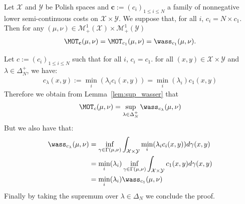 \begin{prop}
Let $\mathcal{X}$ and $\mathcal{Y}$ be Polish spaces and $\mathbf{c}:=(c_i)_{1\leq i\leq N}$ a family of nonnegative lower semi-continuous costs on $\mathcal{X}\times \mathcal{Y}$. We suppose that, for all $i$, $c_i= N\times c_1$. Then for any $(\mu,\nu)\in\mathcal{M}_+^{1}(\mathcal{X})\times\mathcal{M}_+^{1}(\mathcal{Y})$  
\begin{align}
    \MOT_{\mathbf{c}}(\mu,\nu)=\MOT_{c_1}(\mu,\nu)=\wass_{c_1}(\mu,\nu).
\end{align}
\end{prop}
\begin{prv*}
Let $c:=(c_i)_{1\leq i\leq N}$ such that for all $i$, $c_i=c_1$. for all $(x,y)\in\mathcal{X}\times \mathcal{Y}$ and $\lambda\in\Delta^+_N$, we have:
\begin{align*}
    c_\lambda(x,y):=\min_i(\lambda_i c_i(x,y)) = \min_i(\lambda_i)c_1(x,y)
\end{align*}
Therefore we obtain from Lemma~\ref{lem:sup_wasser} that
\begin{align}
    \MOT_{c}(\mu,\nu)=\sup_{\lambda\in\Delta^+_N} \wass_{c_\lambda}(\mu,\nu)
\end{align}
But we also have that:
\begin{align*}
    \wass_{c_\lambda}(\mu,\nu)&=\inf_{\gamma\in\Gamma(\mu,\nu)}\int_{\mathcal{X}\times \mathcal{Y}} \min_i(\lambda_i c_i(x,y))d\gamma(x,y)\\
    &=\min_i(\lambda_i )\inf_{\gamma\in\Gamma(\mu,\nu)}\int_{\mathcal{X}\times \mathcal{Y}} c_1(x,y) d\gamma(x,y)\\
    &=\min_i(\lambda_i )  \wass_{c_1}(\mu,\nu)
\end{align*}
Finally by taking the supremum over $\lambda\in\Delta_N$ we conclude the proof.
\end{prv*}

